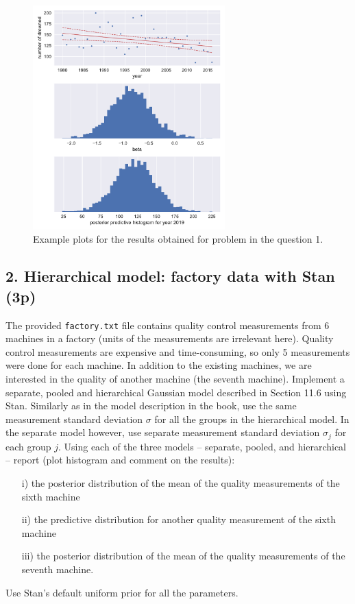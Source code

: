 \documentclass[a4paper,11pt]{article}
\begin{document}
\begin{figure}
\centering
   \includegraphics[width=0.66\textwidth]{ex7_fig1.pdf}
\caption{Example plots for the results obtained for problem in the question 1.}\label{fig1}
\end{figure}



\subsection*{2. Hierarchical model: factory data with Stan (3p)}
The provided {\tt factory.txt} file contains quality control measurements from 6 machines in a factory (units of the measurements are irrelevant here). Quality control measurements are expensive and time-consuming, so only 5 measurements were done for each machine. In addition to the existing machines, we are interested in the quality of another machine (the seventh machine).
Implement a separate, pooled and hierarchical Gaussian model described in Section 11.6 using Stan.
Similarly as in the model description in the book, use the same measurement standard deviation $\sigma$ for all the groups in the hierarchical model. In the separate model however, use separate measurement standard deviation $\sigma_j$ for each group $j$.
Using each of the three models -- separate, pooled, and hierarchical -- report (plot histogram and comment on the results):
\begin{itemize}
	\item [i)] the posterior distribution of the mean of the quality measurements of the sixth machine
	\item [ii)] the predictive distribution for another quality measurement of the sixth machine
	\item [iii)] the posterior distribution of the mean of the quality measurements of the seventh machine.
\end{itemize}
Use Stan's default uniform prior for all the parameters.
\end{document}
